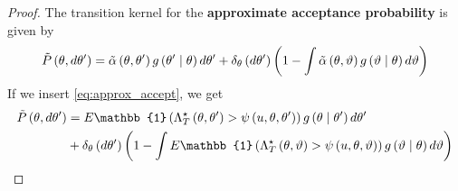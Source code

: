 {\begin{proof}
The transition kernel for the \textbf{approximate acceptance probability} is given by 
\begin{equation*}
    \Tilde{P}\left(\theta, d\theta'\right) = \Tilde{\alpha}\left(\theta, \theta'\right)g\left(\theta'\mid \theta \right) d\theta' + \delta_{\theta}\left(d\theta'\right)\left(1 - \int\Tilde{\alpha}\left(\theta, \vartheta\right)g\left(\vartheta\mid \theta\right) d\vartheta \right) 
\end{equation*}
If we insert \eqref{eq:approx_accept}, we get 
\begin{equation}
\begin{split}
    \Tilde{P}\left(\theta, d\theta'\right) &=  E\mathbb{1} \left(\Lambda_T^{\star}\left(\theta, \theta'\right) > \psi\left(u, \theta, \theta'\right)\right)g\left(\theta \mid \theta' \right) d\theta'\\
    &+ \delta_{\theta} \left(d\theta'\right)\left(1 - \int E \mathbb{1}\left(\Lambda_T^{\star}\left(\theta, \vartheta\right) > \psi \left(u,  \theta, \vartheta\right) \right)g\left(\vartheta \mid \theta\right) d\vartheta  \right)
\end{split}
\end{equation}
\end{proof}
}
